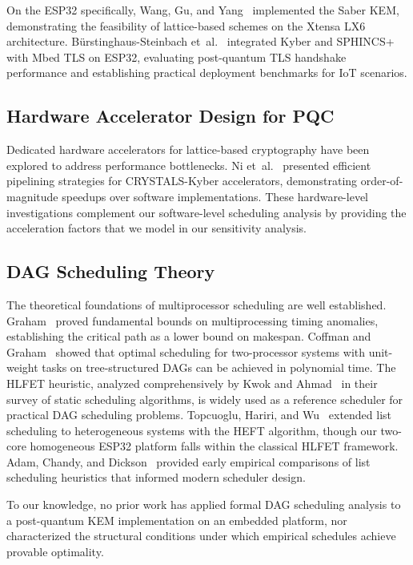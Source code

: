 \documentclass[journal]{IEEEtran}
\begin{document}
On the ESP32 specifically, Wang, Gu, and Yang~\cite{wang2020} implemented the Saber KEM, demonstrating the feasibility of lattice-based schemes on the Xtensa LX6 architecture. B\"urstinghaus-Steinbach et~al.~\cite{buerstinghaus2020} integrated Kyber and SPHINCS+ with Mbed TLS on ESP32, evaluating post-quantum TLS handshake performance and establishing practical deployment benchmarks for IoT scenarios.

\subsection{Hardware Accelerator Design for PQC}

Dedicated hardware accelerators for lattice-based cryptography have been explored to address performance bottlenecks. Ni et~al.~\cite{ni2022} presented efficient pipelining strategies for CRYSTALS-Kyber accelerators, demonstrating order-of-magnitude speedups over software implementations. These hardware-level investigations complement our software-level scheduling analysis by providing the acceleration factors that we model in our sensitivity analysis.

\subsection{DAG Scheduling Theory}

The theoretical foundations of multiprocessor scheduling are well established. Graham~\cite{graham1969} proved fundamental bounds on multiprocessing timing anomalies, establishing the critical path as a lower bound on makespan. Coffman and Graham~\cite{coffman1972} showed that optimal scheduling for two-processor systems with unit-weight tasks on tree-structured DAGs can be achieved in polynomial time. The HLFET heuristic, analyzed comprehensively by Kwok and Ahmad~\cite{kwok1999} in their survey of static scheduling algorithms, is widely used as a reference scheduler for practical DAG scheduling problems. Topcuoglu, Hariri, and Wu~\cite{topcuoglu2002} extended list scheduling to heterogeneous systems with the HEFT algorithm, though our two-core homogeneous ESP32 platform falls within the classical HLFET framework. Adam, Chandy, and Dickson~\cite{adam1974} provided early empirical comparisons of list scheduling heuristics that informed modern scheduler design.

To our knowledge, no prior work has applied formal DAG scheduling analysis to a post-quantum KEM implementation on an embedded platform, nor characterized the structural conditions under which empirical schedules achieve provable optimality.
\end{document}
